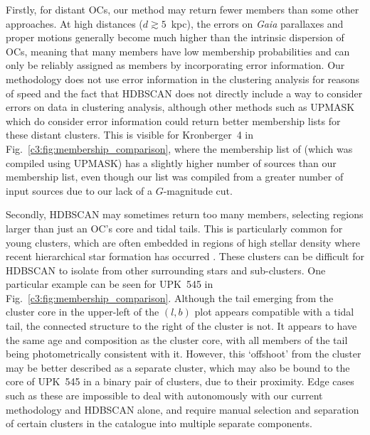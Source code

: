 Firstly, for distant OCs, our method may return fewer members than some other approaches. At high distances ($d \gtrsim 5$~kpc), the errors on \emph{Gaia} parallaxes and proper motions generally become much higher than the intrinsic dispersion of OCs, meaning that many members have low membership probabilities and can only be reliably assigned as members by incorporating error information. Our methodology does not use error information in the clustering analysis for reasons of speed and the fact that HDBSCAN does not directly include a way to consider errors on data in clustering analysis, although other methods such as UPMASK \citep{krone-martins_upmask:_2014} which do consider error information could return better membership lists for these distant clusters. This is visible for Kronberger~4 in Fig.~\ref{c3:fig:membership_comparison}, where the membership list of \cite{cantat-gaudin_clusters_2020} (which was compiled using UPMASK) has a slightly higher number of sources than our membership list, even though our list was compiled from a greater number of input sources due to our lack of a $G$-magnitude cut.

Secondly, HDBSCAN may sometimes return too many members, selecting regions larger than just an OC's core and tidal tails. This is particularly common for young clusters, which are often embedded in regions of high stellar density where recent hierarchical star formation has occurred \citep{portegies_zwart_young_2010}. These clusters can be difficult for HDBSCAN to isolate from other surrounding stars and sub-clusters. One particular example can be seen for UPK~545 in Fig.~\ref{c3:fig:membership_comparison}. Although the tail emerging from the cluster core in the upper-left of the $(l,b)$ plot appears compatible with a tidal tail, the connected structure to the right of the cluster is not. It appears to have the same age and composition as the cluster core, with all members of the tail being photometrically consistent with it. However, this `offshoot' from the cluster may be better described as a separate cluster, which may also be bound to the core of UPK~545 in a binary pair of clusters, due to their proximity. Edge cases such as these are impossible to deal with autonomously with our current methodology and HDBSCAN alone, and require manual selection and separation of certain clusters in the catalogue into multiple separate components.

